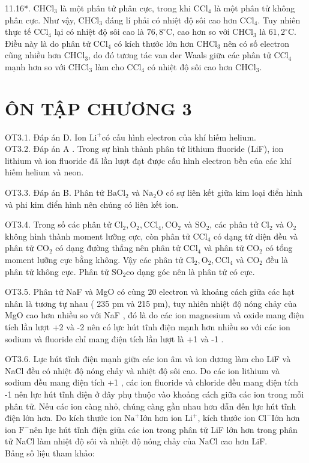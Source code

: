 \documentclass[10pt]{article}
\begin{document}
11.16*. $\mathrm{CHCl}_{3}$ là một phân tử phân cực, trong khi $\mathrm{CCl}_{4}$ là một phân tử không phân cực. Như vậy, $\mathrm{CHCl}_{3}$ đáng lí phải có nhiệt độ sôi cao hơn $\mathrm{CCl}_{4}$. Tuy nhiên thực tế $\mathrm{CCl}_{4}$ lại có nhiệt độ sôi cao là $76,8^{\circ} \mathrm{C}$, cao hơn so với $\mathrm{CHCl}_{3}$ là $61,2^{\circ} \mathrm{C}$. Điều này là do phân tử $\mathrm{CCl}_{4}$ có kích thước lớn hơn $\mathrm{CHCl}_{3}$ nên có số electron cũng nhiều hơn $\mathrm{CHCl}_{3}$, do đó tương tác van der Waals giữa các phân tử $\mathrm{CCl}_{4}$ mạnh hơn so với $\mathrm{CHCl}_{3}$ làm cho $\mathrm{CCl}_{4}$ có nhiệt độ sôi cao hơn $\mathrm{CHCl}_{3}$.

\section*{ÔN TẬP CHƯƠNG 3}
OT3.1. Đáp án D. Ion $\mathrm{Li}^{+}$có cấu hình electron của khí hiếm helium.\\
OT3.2. Đáp án A . Trong sự hình thành phân tử lithium fluoride (LiF), ion lithium và ion fluoride đã lần lượt đạt được cấu hình electron bền của các khí hiếm helium và neon.

OT3.3. Đáp án B. Phân tử $\mathrm{BaCl}_{2}$ và $\mathrm{Na}_{2} \mathrm{O}$ có sự liên kết giữa kim loại điển hình và phi kim điển hình nên chúng có liên kết ion.

OT3.4. Trong số các phân tử $\mathrm{Cl}_{2}, \mathrm{O}_{2}, \mathrm{CCl}_{4}, \mathrm{CO}_{2}$ và $\mathrm{SO}_{2}$, các phân tử $\mathrm{Cl}_{2}$ và $\mathrm{O}_{2}$ không hình thành moment lưỡng cực, còn phân tử $\mathrm{CCl}_{4}$ có dạng tứ diện đều và phân tử $\mathrm{CO}_{2}$ có dạng đường thẳng nên phân tử $\mathrm{CCl}_{4}$ và phân tử $\mathrm{CO}_{2}$ có tổng moment lưỡng cực bằng không. Vậy các phân tử $\mathrm{Cl}_{2}, \mathrm{O}_{2}, \mathrm{CCl}_{4}$ và $\mathrm{CO}_{2}$ đều là phân tử không cực. Phân tử $\mathrm{SO}_{2} \mathrm{co}$ dạng góc nên là phân tử có cực.

OT3.5. Phân tử NaF và MgO có cùng 20 electron và khoảng cách giữa các hạt nhân là tương tự nhau ( 235 pm và 215 pm), tuy nhiên nhiệt độ nóng chảy của MgO cao hơn nhiều so với NaF , đó là do các ion magnesium và oxide mang điện tích lần lượt +2 và -2 nên có lực hút tĩnh điện mạnh hơn nhiều so với các ion sodium và fluoride chỉ mang điện tích lần lượt là +1 và -1 .

OT3.6. Lực hút tĩnh điện mạnh giữa các ion âm và ion dương làm cho LiF và NaCl đều có nhiệt độ nóng chảy và nhiệt độ sôi cao. Do các ion lithium và sodium đều mang điện tích +1 , các ion fluoride và chloride đều mang điện tích -1 nên lực hút tĩnh điện ở đây phụ thuộc vào khoảng cách giữa các ion trong mỗi phân tử. Nếu các ion càng nhỏ, chúng càng gần nhau hơn dẫn đến lực hút tĩnh điện lớn hơn. Do kích thước ion $\mathrm{Na}^{+}$Iớn hơn ion $\mathrm{Li}^{+}$, kích thước ion $\mathrm{Cl}^{-}$Iớn hơn ion $\mathrm{F}^{-}$nên lực hút tĩnh điện giữa các ion trong phân tử LiF lớn hơn trong phân tử NaCl làm nhiệt độ sôi và nhiệt độ nóng chảy của NaCl cao hơn LiF.\\
Bảng số liệu tham khảo:
\end{document}
